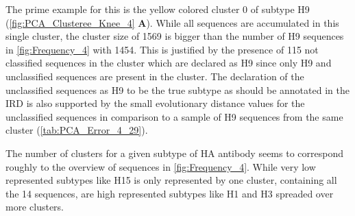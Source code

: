 The prime example for this is the yellow colored cluster 0 of subtype H9 (\autoref{fig:PCA_Clusteree_Knee_4} \textbf{\textsf{A}}). While all sequences are accumulated in this single cluster, the cluster size of 1569 is bigger than the number of H9 sequences in \autoref{fig:Frequency_4} with 1454. This is justified by the presence of 115 not classified sequences in the cluster which are declared as H9 since only H9 and unclassified sequences are present in the cluster. The declaration of the unclassified sequences as H9 to be the true subtype as should be annotated in the \gls{IRD} is also supported by the small evolutionary distance values for the unclassified sequences in comparison to a sample of H9 sequences from the same cluster (\autoref{tab:PCA_Error_4_29}).

The number of clusters for a given subtype of \gls{HA} antibody seems to correspond roughly to the overview of sequences in \autoref{fig:Frequency_4}. While very low represented subtypes like H15 is only represented by one cluster, containing all the 14 sequences, are high represented subtypes like H1 and H3 spreaded over more clusters.

